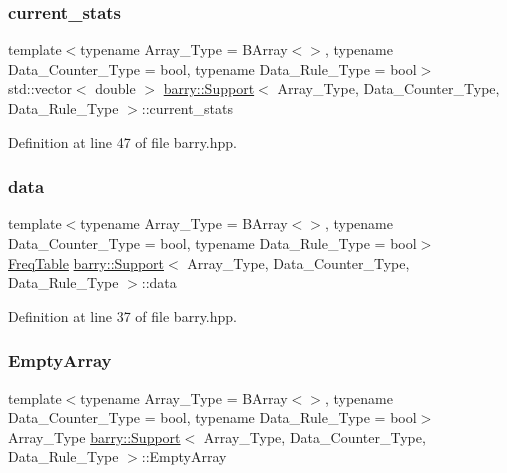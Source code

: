 \subsubsection{\texorpdfstring{current\+\_\+stats}{current\_stats}}
{\footnotesize\ttfamily template$<$typename Array\+\_\+\+Type = B\+Array$<$$>$, typename Data\+\_\+\+Counter\+\_\+\+Type = bool, typename Data\+\_\+\+Rule\+\_\+\+Type = bool$>$ \\
std\+::vector$<$ double $>$ \hyperlink{classbarry_1_1_support}{barry\+::\+Support}$<$ Array\+\_\+\+Type, Data\+\_\+\+Counter\+\_\+\+Type, Data\+\_\+\+Rule\+\_\+\+Type $>$\+::current\+\_\+stats}



Definition at line 47 of file barry.\+hpp.

\mbox{\label{classbarry_1_1_support_ab58b9801dcbb924d68fd18db0821de99}} 
\subsubsection{\texorpdfstring{data}{data}}
{\footnotesize\ttfamily template$<$typename Array\+\_\+\+Type = B\+Array$<$$>$, typename Data\+\_\+\+Counter\+\_\+\+Type = bool, typename Data\+\_\+\+Rule\+\_\+\+Type = bool$>$ \\
\hyperlink{classbarry_1_1_freq_table}{Freq\+Table} \hyperlink{classbarry_1_1_support}{barry\+::\+Support}$<$ Array\+\_\+\+Type, Data\+\_\+\+Counter\+\_\+\+Type, Data\+\_\+\+Rule\+\_\+\+Type $>$\+::data}



Definition at line 37 of file barry.\+hpp.

\mbox{\label{classbarry_1_1_support_a2eec6569a9206965a679782f7acf12e5}} 
\subsubsection{\texorpdfstring{Empty\+Array}{EmptyArray}}
{\footnotesize\ttfamily template$<$typename Array\+\_\+\+Type = B\+Array$<$$>$, typename Data\+\_\+\+Counter\+\_\+\+Type = bool, typename Data\+\_\+\+Rule\+\_\+\+Type = bool$>$ \\
Array\+\_\+\+Type \hyperlink{classbarry_1_1_support}{barry\+::\+Support}$<$ Array\+\_\+\+Type, Data\+\_\+\+Counter\+\_\+\+Type, Data\+\_\+\+Rule\+\_\+\+Type $>$\+::Empty\+Array}



